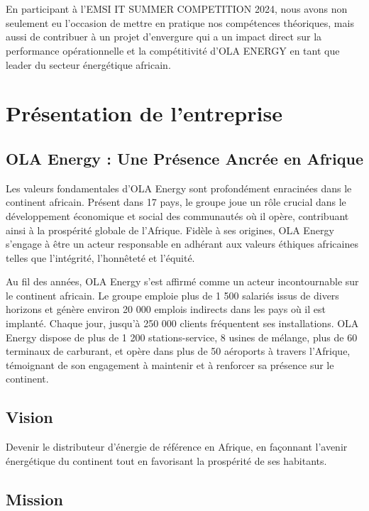 \documentclass[a4paper, oneside, 12pt, final]{extreport}
\begin{document}
\\
\\
En participant à l'\textsc{EMSI IT SUMMER COMPETITION 2024}, nous avons non seulement eu l'occasion de mettre en pratique nos compétences théoriques, mais aussi de contribuer à un projet d'envergure qui a un impact direct sur la performance opérationnelle et la compétitivité d'\textsc{OLA ENERGY} en tant que leader du secteur énergétique africain.
\chapter{Présentation de l'entreprise}
\section{OLA Energy : Une Présence Ancrée en Afrique}

Les valeurs fondamentales d'OLA Energy sont profondément enracinées dans le continent africain. Présent dans 17 pays, le groupe joue un rôle crucial dans le développement économique et social des communautés où il opère, contribuant ainsi à la prospérité globale de l'Afrique. Fidèle à ses origines, OLA Energy s'engage à être un acteur responsable en adhérant aux valeurs éthiques africaines telles que l'intégrité, l'honnêteté et l'équité.

Au fil des années, OLA Energy s'est affirmé comme un acteur incontournable sur le continent africain. Le groupe emploie plus de 1 500 salariés issus de divers horizons et génère environ 20 000 emplois indirects dans les pays où il est implanté. Chaque jour, jusqu'à 250 000 clients fréquentent ses installations. OLA Energy dispose de plus de 1 200 stations-service, 8 usines de mélange, plus de 60 terminaux de carburant, et opère dans plus de 50 aéroports à travers l'Afrique, témoignant de son engagement à maintenir et à renforcer sa présence sur le continent.

\section{Vision}

Devenir le distributeur d’énergie de référence en Afrique, en façonnant l'avenir énergétique du continent tout en favorisant la prospérité de ses habitants.

\section{Mission}
\end{document}
